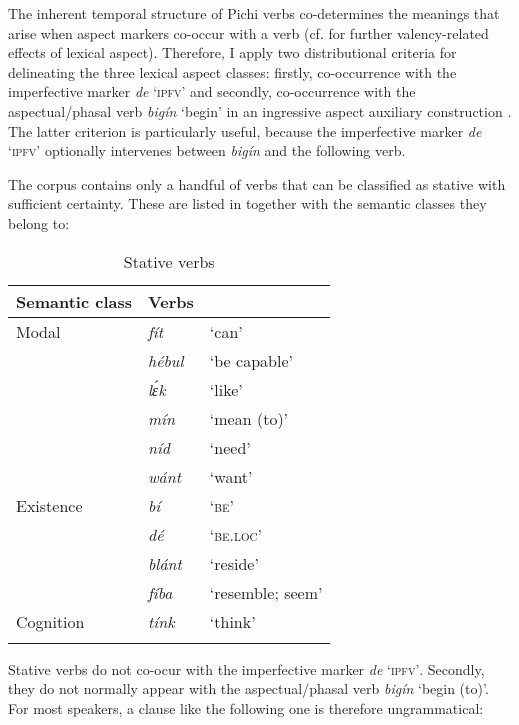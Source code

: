 The inherent temporal structure of Pichi verbs co-determines the meanings that arise when aspect markers co-occur with a verb (cf.  for further valency-related effects of lexical aspect). Therefore, I apply two distributional criteria for delineating the three lexical aspect classes: firstly, co-occurrence with the imperfective marker \textit{de} ‘\textsc{ipfv’} and secondly, co-occurrence with the aspectual/phasal verb \textit{bigín} ‘begin’ in an ingressive aspect auxiliary construction \citep[8]{Sasse1991}. The latter criterion is particularly useful, because the imperfective marker \textit{de} ‘\textsc{ipfv’} optionally intervenes between \textit{bigín} and the following verb.



The corpus contains only a handful of verbs that can be classified as stative with sufficient certainty. These are listed in  together with the semantic classes they belong to: 


\begin{table}
\caption{Stative verbs}
\label{tab:key:6.1}

\begin{tabularx}{.8\textwidth}{XXX}
\lsptoprule
Semantic class & Verbs & \\
\midrule
Modal & \itshape fít & ‘can’\\
& \itshape hébul & ‘be capable’\\
& \itshape lɛ́k & ‘like’\\
& \itshape mín & ‘mean (to)’\\
& \itshape níd & ‘need’\\
& \itshape wánt & ‘want’\\

\tablevspace
Existence & \itshape bí & \textsc{‘be’}\\
& \itshape dé & \textsc{‘be.loc’}\\
& \itshape blánt & ‘reside’\\
& \itshape fíba & ‘resemble; seem’\\

\tablevspace
Cognition & \itshape tínk & ‘think’\\
\lspbottomrule
\end{tabularx}
\end{table}
Stative verbs do not co-ocur with the imperfective marker \textit{de} ‘\textsc{ipfv’}. Secondly, they do not normally appear with the aspectual/phasal verb \textit{bigín} ‘begin (to)’. For most speakers, a clause like the following one is therefore ungrammatical: 


